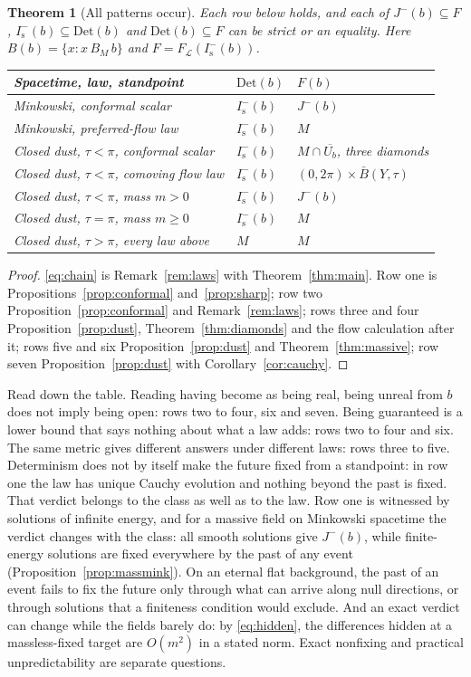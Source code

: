 \documentclass[11pt]{article}
\newtheorem{theorem}{Theorem}
\theoremstyle{definition}
\newcommand{\Jm}{J^{-}}
\newcommand{\Is}{I^-_{\mathrm s}}
\newcommand{\Det}{\mathrm{Det}}
\begin{document}
\begin{theorem}[All patterns occur]\label{thm:map}
Each row below holds, and each of $\Jm(b)\subseteq F$, $\Is(b)\subseteq\Det(b)$ and $\Det(b)\subseteq F$ can be strict or an equality. Here $B(b)=\{x:x\,B_M\,b\}$ and $F=F_{\mathcal L}(\Is(b))$.
\begin{center}
\begin{tabularx}{\textwidth}{@{}Yll@{}}
\toprule
Spacetime, law, standpoint & $\Det(b)$ & $F(b)$\\
\midrule
Minkowski, conformal scalar & $\Is(b)$ & $\Jm(b)$\\
Minkowski, preferred-flow law & $\Is(b)$ & $M$\\
Closed dust, $\tau<\pi$, conformal scalar & $\Is(b)$ & $M\cap\overline{U_b}$, three diamonds\\
Closed dust, $\tau<\pi$, comoving flow law & $\Is(b)$ & $(0,2\pi)\times\bar B(Y,\tau)$\\
Closed dust, $\tau<\pi$, mass $m>0$ & $\Is(b)$ & $\Jm(b)$\\
Closed dust, $\tau=\pi$, mass $m\ge0$ & $\Is(b)$ & $M$\\
Closed dust, $\tau>\pi$, every law above & $M$ & $M$\\
\bottomrule
\end{tabularx}
\end{center}
\end{theorem}

\begin{proof}
\eqref{eq:chain} is Remark~\ref{rem:laws} with Theorem~\ref{thm:main}. Row one is Propositions~\ref{prop:conformal} and~\ref{prop:sharp}; row two Proposition~\ref{prop:conformal} and Remark~\ref{rem:laws}; rows three
and four Proposition~\ref{prop:dust}, Theorem~\ref{thm:diamonds} and the flow calculation after it;
rows five and six Proposition~\ref{prop:dust} and Theorem~\ref{thm:massive}; row seven
Proposition~\ref{prop:dust} with Corollary~\ref{cor:cauchy}.
\end{proof}

Read down the table. Reading having become as being real, being unreal from $b$ does not imply being open: rows two to four, six and
seven. Being guaranteed is a lower bound that says nothing about what a law adds: rows two to four and six. The same metric gives different answers under different laws: rows three to five.
Determinism does not by itself make the future fixed from a standpoint: in row one the law has unique
Cauchy evolution and nothing beyond the past is fixed. That verdict belongs to the class as well as to the law. Row one is witnessed by solutions of infinite energy, and for a massive field on Minkowski spacetime the verdict changes with the class: all smooth solutions give $\Jm(b)$, while finite-energy solutions are fixed everywhere by the past of any event (Proposition~\ref{prop:massmink}). On an eternal flat background, the past of an event fails to fix the future only through what can arrive along null directions, or through solutions that a finiteness condition would exclude. And an exact verdict can change while the
fields barely do: by \eqref{eq:hidden}, the differences hidden at a massless-fixed target are
$O(m^2)$ in a stated norm. Exact nonfixing and practical unpredictability are separate questions.
\end{document}
